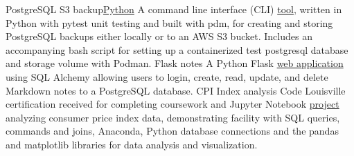 \datedsubsection{}
{PostgreSQL S3 backup}{\href{https://github.com/JacobArchambault?tab=repositories&q=&type=&language=python&sort=}{Python}}
{A command line interface (CLI) \href{https://github.com/JacobArchambault/pgbackup}{tool}, written in Python with pytest unit testing and built with pdm, for creating and storing PostgreSQL backups either locally or to an AWS S3 bucket. Includes an accompanying bash script for setting up a containerized test postgresql database and storage volume with Podman.}
\datedsubsection{}
{Flask notes}{}
{A Python Flask \href{https://github.com/JacobArchambault/flask_notes}{ web application} using SQL Alchemy allowing users to login, create, read, update, and delete Markdown notes to a PostgreSQL database.}
\datedsubsection{}
{CPI Index analysis}{}
{Code Louisville certification received for completing coursework and Jupyter Notebook \href{https://github.com/jacobarchambault/cpi-python}{project} analyzing consumer price index data, demonstrating facility with SQL queries, commands and joins, Anaconda, Python database connections and the pandas and matplotlib libraries for data analysis and visualization.}